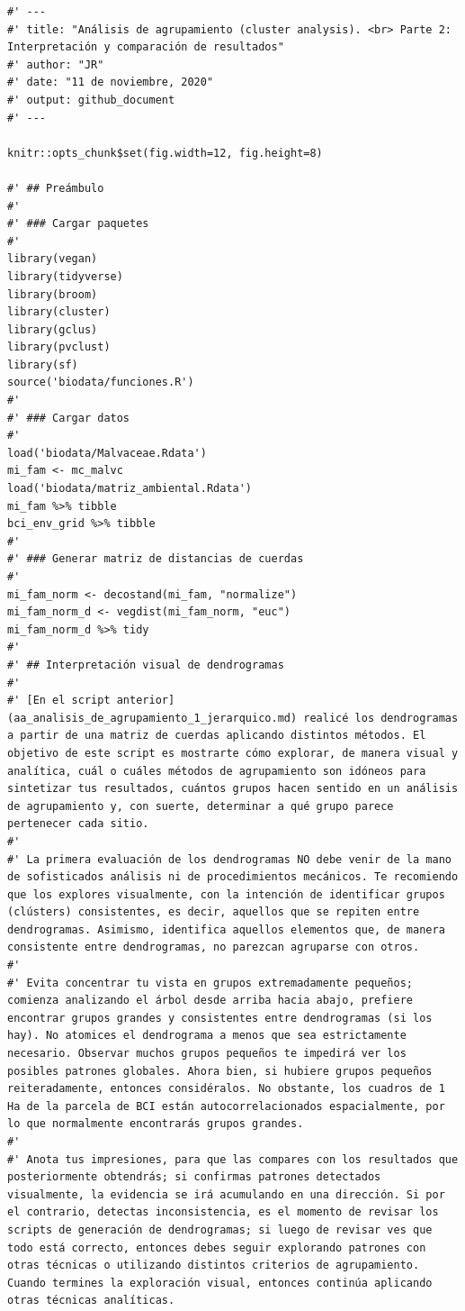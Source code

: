 \documentclass[11pt,]{article}
\begin{document}
\begin{verbatim}
#' ---
#' title: "Análisis de agrupamiento (cluster analysis). <br> Parte 2: Interpretación y comparación de resultados"
#' author: "JR"
#' date: "11 de noviembre, 2020"
#' output: github_document
#' ---

knitr::opts_chunk$set(fig.width=12, fig.height=8)

#' ## Preámbulo
#' 
#' ### Cargar paquetes
#' 
library(vegan)
library(tidyverse)
library(broom)
library(cluster)
library(gclus)
library(pvclust)
library(sf)
source('biodata/funciones.R')
#' 
#' ### Cargar datos
#' 
load('biodata/Malvaceae.Rdata')
mi_fam <- mc_malvc
load('biodata/matriz_ambiental.Rdata')
mi_fam %>% tibble
bci_env_grid %>% tibble
#' 
#' ### Generar matriz de distancias de cuerdas
#' 
mi_fam_norm <- decostand(mi_fam, "normalize")
mi_fam_norm_d <- vegdist(mi_fam_norm, "euc")
mi_fam_norm_d %>% tidy
#' 
#' ## Interpretación visual de dendrogramas
#' 
#' [En el script anterior](aa_analisis_de_agrupamiento_1_jerarquico.md) realicé los dendrogramas a partir de una matriz de cuerdas aplicando distintos métodos. El objetivo de este script es mostrarte cómo explorar, de manera visual y analítica, cuál o cuáles métodos de agrupamiento son idóneos para sintetizar tus resultados, cuántos grupos hacen sentido en un análisis de agrupamiento y, con suerte, determinar a qué grupo parece pertenecer cada sitio.
#' 
#' La primera evaluación de los dendrogramas NO debe venir de la mano de sofisticados análisis ni de procedimientos mecánicos. Te recomiendo que los explores visualmente, con la intención de identificar grupos (clústers) consistentes, es decir, aquellos que se repiten entre dendrogramas. Asimismo, identifica aquellos elementos que, de manera consistente entre dendrogramas, no parezcan agruparse con otros.
#' 
#' Evita concentrar tu vista en grupos extremadamente pequeños; comienza analizando el árbol desde arriba hacia abajo, prefiere encontrar grupos grandes y consistentes entre dendrogramas (si los hay). No atomices el dendrograma a menos que sea estrictamente necesario. Observar muchos grupos pequeños te impedirá ver los posibles patrones globales. Ahora bien, si hubiere grupos pequeños reiteradamente, entonces considéralos. No obstante, los cuadros de 1 Ha de la parcela de BCI están autocorrelacionados espacialmente, por lo que normalmente encontrarás grupos grandes.
#' 
#' Anota tus impresiones, para que las compares con los resultados que posteriormente obtendrás; si confirmas patrones detectados visualmente, la evidencia se irá acumulando en una dirección. Si por el contrario, detectas inconsistencia, es el momento de revisar los scripts de generación de dendrogramas; si luego de revisar ves que todo está correcto, entonces debes seguir explorando patrones con otras técnicas o utilizando distintos criterios de agrupamiento. Cuando termines la exploración visual, entonces continúa aplicando otras técnicas analíticas.

\end{verbatim}
\end{document}

